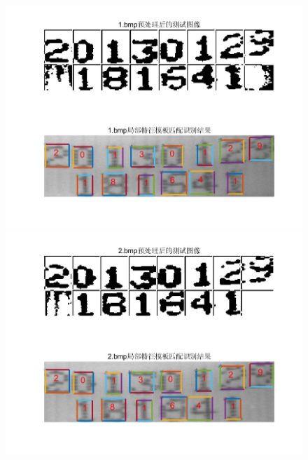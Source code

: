 \documentclass[cn]{elegantbook}
\begin{document}
\begin{figure}[!h]
	\centering
	\begin{minipage}[t]{0.48\textwidth}
		\centering
		\includegraphics[width=\textwidth]{save21}
	\end{minipage}
	\begin{minipage}[t]{0.48\textwidth}
		\centering
		\includegraphics[width=\textwidth]{save22}
	\end{minipage}
	\begin{minipage}[t]{0.48\textwidth}
		\centering

\end{minipage}
\end{figure}
\end{document}
